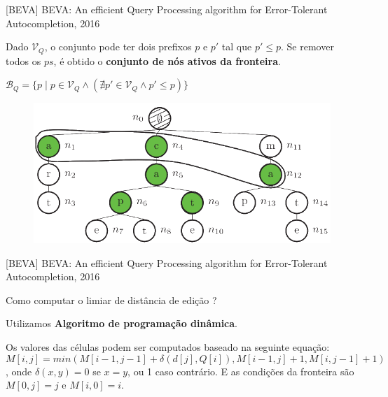 \documentclass[11pt]{beamer}
\begin{document}
\begin{frame}{[BEVA] BEVA: An efficient Query Processing algorithm for Error-Tolerant Autocompletion, 2016}

    Dado $\mathcal{V}_Q$, o conjunto pode ter dois prefixos $p$ e $p'$ tal que $p' \le p$. Se remover todos os $ps$, é obtido o \textbf{conjunto de nós ativos da fronteira}.
    
    $\mathcal{B}_Q =  \{ p \mid p \in \mathcal{V}_Q \land (\nexists p' \in \mathcal{V}_Q \land p' \le p)\}$ 

    \begin{figure}
      \includegraphics[scale=0.35]{pictures/boundary_active_nodes_beva.png}
      \centering
    \end{figure}
    
\end{frame}

\begin{frame}{[BEVA] BEVA: An efficient Query Processing algorithm for Error-Tolerant Autocompletion, 2016}

    Como computar o limiar de distância de edição ? \pause
    
    Utilizamos \textbf{Algoritmo de programação dinâmica}. \pause 
    
    Os valores das células podem ser computados baseado na seguinte equação: \[ M[i, j] = min(M[i - 1, j - 1] + \delta(d[j], Q[i]), M[i - 1, j] + 1, M[i, j - 1] + 1) \], onde $\delta(x, y) = 0$ se $x = y$, ou 1 caso contrário. E as condições da fronteira são $M[0, j] = j$ e $M[i, 0] = i$.
    
\end{frame}
\end{document}

